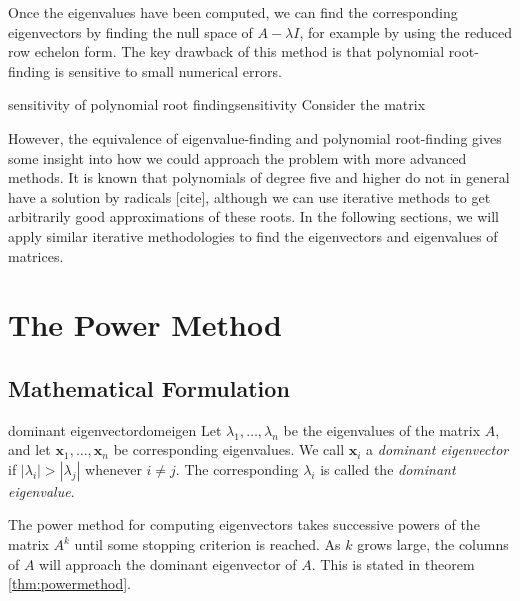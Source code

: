 \documentclass{article}
\let\vec\mathbf
\begin{document}
Once the eigenvalues have been computed, we can find the corresponding eigenvectors by finding the null space of $A - \lambda I$, for example by using the reduced row echelon form. The key drawback of this method is that polynomial root-finding is sensitive to small numerical errors.

\begin{example}{sensitivity of polynomial root finding}{sensitivity}
  Consider the matrix
\end{example}

However, the equivalence of eigenvalue-finding and polynomial root-finding gives some insight into how we could approach the problem with more advanced methods. It is known that polynomials of degree five and higher do not in general have a solution by radicals [cite], although we can use iterative methods to get arbitrarily good approximations of these roots. In the following sections, we will apply similar iterative methodologies to find the eigenvectors and eigenvalues of matrices.

\section{The Power Method}
\subsection{Mathematical Formulation}
\begin{definition}{dominant eigenvector}{domeigen}
  Let $\lambda_1, \ldots, \lambda_n$ be the eigenvalues of the matrix $A$, and let $\vec{x}_1, \ldots, \vec{x}_n$ be corresponding eigenvalues. We call $\vec{x}_i$ a \textit{dominant eigenvector} if $|\lambda_i| > |\lambda_j|$ whenever $i \neq j$. The corresponding $\lambda_i$ is called the \textit{dominant eigenvalue}.
\end{definition}

The power method for computing eigenvectors takes successive powers of the matrix $A^k$ until some stopping criterion is reached. As $k$ grows large, the columns of $A$ will approach the dominant eigenvector of $A$. This is stated in theorem \ref{thm:powermethod}.
\end{document}
